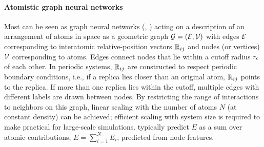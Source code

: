 \documentclass[10pt]{article} %
\begin{document}
\paragraph{Atomistic graph neural networks}
Most \mlps can be seen as graph neural networks (\gnns, \cite{bhbszmtrsfgsbgdvanldhwkbvlp2018}) acting on a description of an arrangement of atoms in space as a geometric graph ${\mathcal{G}}=({\mathcal{E}},{\mathcal{V}})$ with edges ${\mathcal{E}}$ corresponding to interatomic relative-position vectors $\mathbb{R}_{ij}$ and nodes (or vertices) ${\mathcal{V}}$ corresponding to atoms. Edges connect nodes that lie within a cutoff radius $r_{\text{c}}$ of each other. In periodic systems, $\mathbb{R}_{ij}$ are constructed to respect periodic boundary conditions, i.e., if a replica lies closer than an original atom, $\mathbb{R}_{ij}$ points to the replica. If more than one replica lies within the cutoff, multiple edges with different labels are drawn between nodes.
By restricting the range of interactions to neighbors on this graph, linear scaling with the number of atoms $N$ (at constant density) can be achieved; efficient scaling with system size is required to make \mlps practical for large-scale simulations.
\mlps typically predict $E$ as a sum over atomic contributions, $E=\sum_{i=1}^N E_i$, predicted from node features.

\end{document}
